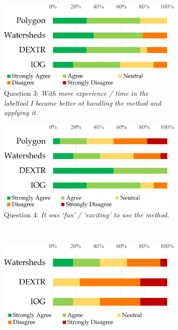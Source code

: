 \begin{figure} [h!]
\begin{subfigure}[t]{0.48\textwidth}
{		} \label{fig:ch5:sec4:q2}
	\end{subfigure}
	\\
	\begin{subfigure}[t]{0.48\textwidth}
		\centering
		\includegraphics[width=\textwidth]{figures/chap54_q3.png}
		\caption{
			Question 3: \textit{With more experience / time in the labeltool I became better at handling the method and applying it.}
		} \label{fig:ch5:sec4:q3}
	\end{subfigure}
	\hfill
	\begin{subfigure}[t]{0.48\textwidth}
		\centering
		\includegraphics[width=\textwidth]{figures/chap54_q5.png}
		\caption{
			Question 4: \textit{It was ‘fun’ / ‘exciting’ to use the method.}
		} \label{fig:ch5:sec4:q4}
	\end{subfigure}
	\\
	\begin{subfigure}[t]{0.48\textwidth}
		\centering
		\includegraphics[width=\textwidth]{figures/chap54_q4.png}

\end{subfigure}
\end{figure}
